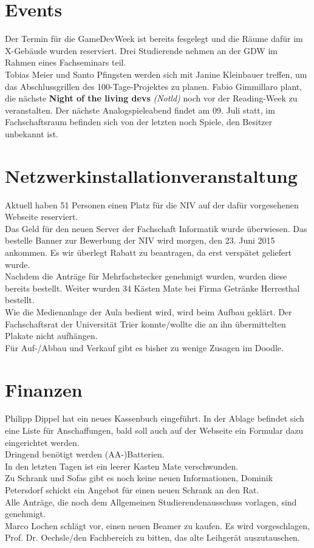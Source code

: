 \documentclass[a4paper, 11pt]{article} %
\begin{document}
\section{Events}
Der Termin für die GameDevWeek ist bereits fesgelegt und die Räume dafür im X-Gebäude wurden reserviert. Drei Studierende nehmen an der GDW im Rahmen eines Fachseminars teil.\\
Tobias Meier und Santo Pfingsten werden sich mit Janine Kleinbauer treffen, um das Abschlussgrillen des 100-Tage-Projektes zu planen.
Fabio Gimmillaro plant, die nächste \textbf{Night of the living devs} \textit{(Notld)} noch vor der Reading-Week zu veranstalten.
Der nächste Analogspieleabend findet am 09. Juli statt, im Fachschaftsraum befinden sich von der letzten noch Spiele, den Besitzer unbekannt ist.

\section{Netzwerkinstallationveranstaltung}
Aktuell haben 51 Personen einen Platz für die NIV auf der dafür vorgesehenen Webseite reserviert.\\
Das Geld für den neuen Server der Fachschaft Informatik wurde überwiesen. Das bestelle Banner zur Bewerbung der NIV wird morgen, den 23. Juni 2015 ankommen. Es wir überlegt Rabatt zu beantragen, da erst verspätet geliefert wurde.\\
Nachdem die Anträge für Mehrfachstecker genehmigt wurden, wurden diese bereits bestellt. Weiter wurden 34 Kästen Mate bei Firma Getränke Herresthal bestellt.\\
Wie die Medienanlage der Aula bedient wird, wird beim Aufbau geklärt.
Der Fachschaftsrat der Universität Trier konnte/wollte die an ihn übermittelten Plakate nicht aufhängen.\\
Für Auf-/Abbau und Verkauf gibt es bisher zu wenige Zusagen im Doodle.

\section{Finanzen}
Philipp Dippel hat ein neues Kassenbuch eingeführt. In der Ablage befindet sich eine Liste für Anschaffungen, bald soll auch auf der Webseite ein Formular dazu eingerichtet werden.\\
Dringend benötigt werden (AA-)Batterien.\\
In den letzten Tagen ist ein leerer Kasten Mate verschwunden.\\
Zu Schrank und Sofas gibt es noch keine neuen Informationen, Dominik Petersdorf schickt ein Angebot für einen neuen Schrank an den Rat.\\
Alle Anträge, die noch dem Allgemeinen Studierendenausschuss vorlagen, sind genehmigt.\\
Marco Lochen schlägt vor, einen neuen Beamer zu kaufen. Es wird vorgeschlagen, Prof. Dr. Oechsle/den Fachbereich zu bitten, das alte Leihgerät auszutauschen.
\end{document}
